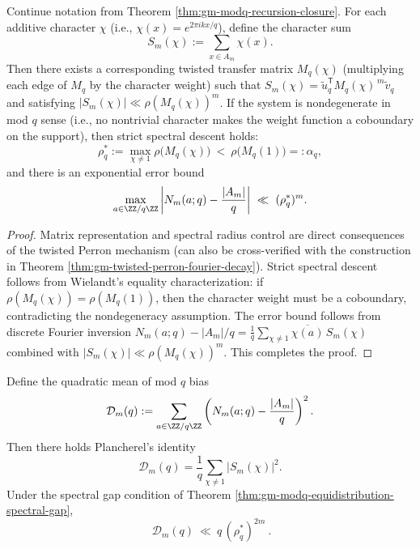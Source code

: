 \begin{theorem}\label{thm:gm-modq-equidistribution-spectral-gap}
Continue notation from Theorem \ref{thm:gm-modq-recursion-closure}.
For each additive character \(\chi\) (i.e., \(\chi(x)=e^{2\pi i kx/q}\)), define the character sum
\[
S_m(\chi):=\sum_{x\in A_m}\chi(x).
\]
Then there exists a corresponding twisted transfer matrix \(M_q(\chi)\) (multiplying each edge of \(M_q\) by the character weight) such that
\(
S_m(\chi)=\tilde u_q^{\mathsf T}M_q(\chi)^{\,m}\tilde v_q
\)
and satisfying
\(
|S_m(\chi)|\ll \rho(M_q(\chi))^m
\).
If the system is nondegenerate in mod \(q\) sense (i.e., no nontrivial character makes the weight function a coboundary on the support), then strict spectral descent holds:
\[
\rho_q^\ast:=\max_{\chi\ne 1}\rho\!\bigl(M_q(\chi)\bigr)\ <\ \rho\!\bigl(M_q(1)\bigr)=:\alpha_q,
\]
and there is an exponential error bound
\[
\max_{a\in\ZZ/q\ZZ}\left|N_m(a;q)-\frac{|A_m|}{q}\right|
\ \ll\ (\rho_q^\ast)^{m}.
\]
\end{theorem}

\begin{proof}
Matrix representation and spectral radius control are direct consequences of the twisted Perron mechanism (can also be cross-verified with the construction in Theorem \ref{thm:gm-twisted-perron-fourier-decay}).
Strict spectral descent follows from Wielandt's equality characterization: if \(\rho(M_q(\chi))=\rho(M_q(1))\), then the character weight must be a coboundary, contradicting the nondegeneracy assumption.
The error bound follows from discrete Fourier inversion
\(
N_m(a;q)-|A_m|/q=\frac{1}{q}\sum_{\chi\ne 1}\overline{\chi(a)}\,S_m(\chi)
\)
combined with \(|S_m(\chi)|\ll \rho(M_q(\chi))^m\). This completes the proof.
\end{proof}

\begin{proposition}\label{prop:gm-chebotarev-plancherel-l2}
Define the quadratic mean of mod \(q\) bias
\[
\mathcal{D}_m(q):=\sum_{a\in\ZZ/q\ZZ}\left(N_m(a;q)-\frac{|A_m|}{q}\right)^2.
\]
Then there holds Plancherel's identity
\[
\mathcal{D}_m(q)=\frac{1}{q}\sum_{\chi\ne 1}|S_m(\chi)|^2.
\]
Under the spectral gap condition of Theorem \ref{thm:gm-modq-equidistribution-spectral-gap},
\[
\boxed{\ \mathcal{D}_m(q)\ \ll\ q\,(\rho_q^\ast)^{2m}\ }.
\]
\end{proposition}

